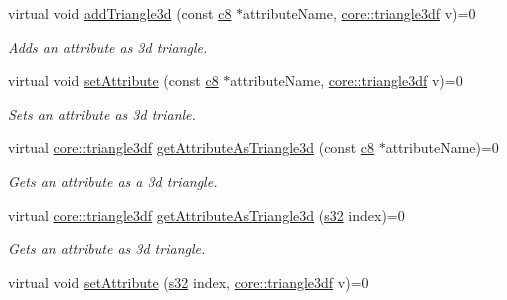 \begin{DoxyCompactItemize}
virtual void \hyperlink{classirr_1_1io_1_1IAttributes_a0f27f971247a14b10945bade9534b045}{add\+Triangle3d} (const \hyperlink{namespaceirr_a9395eaea339bcb546b319e9c96bf7410}{c8} $\ast$attribute\+Name, \hyperlink{namespaceirr_1_1core_a8983bda2678a7a67d97bf3c7be6c31c7}{core\+::triangle3df} v)=0
\begin{DoxyCompactList}\small\item\em Adds an attribute as 3d triangle. \end{DoxyCompactList}\item 
\mbox{\label{classirr_1_1io_1_1IAttributes_ad86e88d9eb7c7af519fedd04d9328ea6}} 
virtual void \hyperlink{classirr_1_1io_1_1IAttributes_ad86e88d9eb7c7af519fedd04d9328ea6}{set\+Attribute} (const \hyperlink{namespaceirr_a9395eaea339bcb546b319e9c96bf7410}{c8} $\ast$attribute\+Name, \hyperlink{namespaceirr_1_1core_a8983bda2678a7a67d97bf3c7be6c31c7}{core\+::triangle3df} v)=0
\begin{DoxyCompactList}\small\item\em Sets an attribute as 3d trianle. \end{DoxyCompactList}\item 
virtual \hyperlink{namespaceirr_1_1core_a8983bda2678a7a67d97bf3c7be6c31c7}{core\+::triangle3df} \hyperlink{classirr_1_1io_1_1IAttributes_a11b477925de4a257400cc7c920ec5e40}{get\+Attribute\+As\+Triangle3d} (const \hyperlink{namespaceirr_a9395eaea339bcb546b319e9c96bf7410}{c8} $\ast$attribute\+Name)=0
\begin{DoxyCompactList}\small\item\em Gets an attribute as a 3d triangle. \end{DoxyCompactList}\item 
virtual \hyperlink{namespaceirr_1_1core_a8983bda2678a7a67d97bf3c7be6c31c7}{core\+::triangle3df} \hyperlink{classirr_1_1io_1_1IAttributes_a75ff98c5c43f887dcaa2f1c8439d791d}{get\+Attribute\+As\+Triangle3d} (\hyperlink{namespaceirr_ac66849b7a6ed16e30ebede579f9b47c6}{s32} index)=0
\begin{DoxyCompactList}\small\item\em Gets an attribute as 3d triangle. \end{DoxyCompactList}\item 
\mbox{\label{classirr_1_1io_1_1IAttributes_ab5aaaa5b8979eef09b005613264dd8af}} 
virtual void \hyperlink{classirr_1_1io_1_1IAttributes_ab5aaaa5b8979eef09b005613264dd8af}{set\+Attribute} (\hyperlink{namespaceirr_ac66849b7a6ed16e30ebede579f9b47c6}{s32} index, \hyperlink{namespaceirr_1_1core_a8983bda2678a7a67d97bf3c7be6c31c7}{core\+::triangle3df} v)=0

\end{DoxyCompactItemize}
